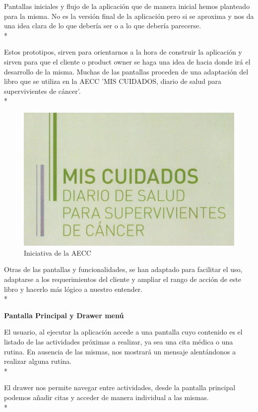 \documentclass[../pfc.tex]{subfiles}
\begin{document}
		Pantallas iniciales y flujo de la aplicación que de manera inicial hemos planteado para la misma.
		No es la versión final de la aplicación pero si se aproxima y nos da una idea clara de lo que debería ser o a lo que debería parecerse.\\*
		
		Estos prototipos, sirven para orientarnos a la hora de construir la aplicación y sirven para que el cliente o product owner se haga una idea de hacia donde irá el desarrollo de la misma. Muchas de las pantallas proceden de una adaptación del libro que se utiliza en la AECC 'MIS CUIDADOS, diario de salud para supervivientes de cáncer'.\\*
		
		\begin{figure}[H]
			\centering
			\includegraphics[width=0.4\linewidth]{../folleto/001_corto}
			\caption{Iniciativa de la AECC}
			\label{fig:001corto}
		\end{figure}
		
		Otras de las pantallas y funcionalidades, se han adaptado para facilitar el uso, adaptarse a los requerimientos del cliente y ampliar el rango de acción de este libro y hacerlo más lógico a nuestro entender.\\*
		
		
		
		\textbf{Pantalla Principal y Drawer menú}
		
		El usuario, al ejecutar la aplicación accede a una pantalla cuyo contenido es el listado de las actividades próximas a realizar, ya sea una cita médica o una rutina. En ausencia de las mismas, nos mostrará un mensaje alentándonos a realizar alguna rutina.\\*
		
		El drawer nos permite navegar entre actividades, desde la pantalla principal podemos añadir citas y acceder de manera individual a las mismas.\\*
	 
\end{document}
